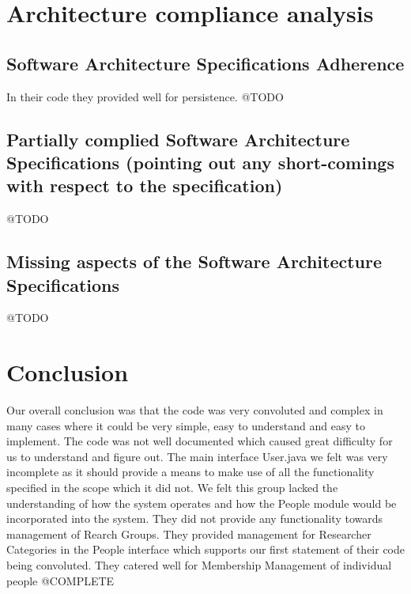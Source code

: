 \documentclass{article}
\begin{document}
    


\section{Architecture compliance analysis}
	\subsection{Software Architecture Specifications Adherence}
	In their code they provided well for persistence.
	@TODO
	\subsection{Partially complied Software Architecture Specifications (pointing out any short-comings with respect to the specification)}
	 @TODO

	\subsection{Missing aspects of the Software Architecture Specifications}
	@TODO


\section{Conclusion}
Our overall conclusion was that the code was very convoluted and complex in many cases where it could be very simple, easy to understand and easy to implement. The code was not well documented which caused great difficulty for us to understand and figure out. The main interface User.java we felt was very incomplete as it should provide a means to make use of all the functionality specified in the scope which it did not. We felt this group lacked the understanding of how the system operates and how the People module would be incorporated into the system. They did not provide any functionality towards management of Rearch Groups. They provided management for Researcher Categories in the People interface which supports our first statement of their code being convoluted. They catered well for Membership Management of individual people
@COMPLETE
\end{document}
